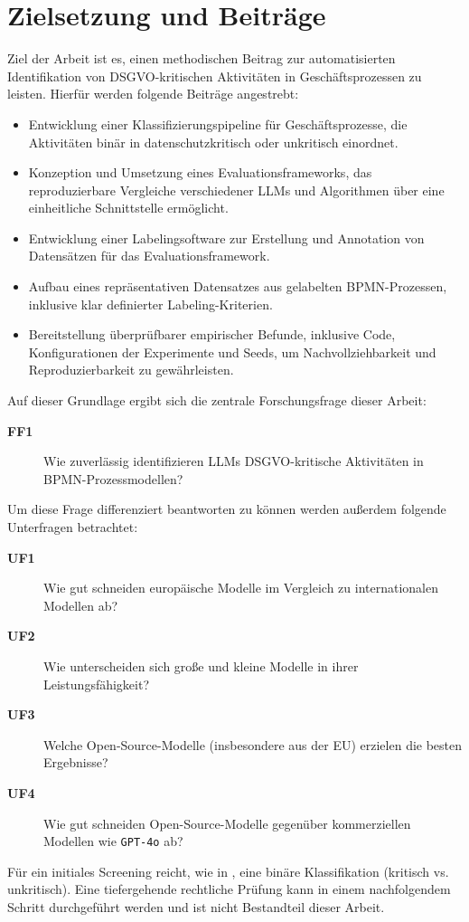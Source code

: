 \section{Zielsetzung und Beiträge}\label{sec:zielsetzung-und-beitrage}

Ziel der Arbeit ist es, einen methodischen Beitrag zur automatisierten Identifikation von \ac{DSGVO}-kritischen Aktivitäten in Geschäftsprozessen zu leisten. Hierfür werden folgende Beiträge angestrebt:

\begin{itemize}
    \item Entwicklung einer Klassifizierungspipeline für Geschäftsprozesse, die Aktivitäten binär in datenschutzkritisch oder unkritisch einordnet.
    \item Konzeption und Umsetzung eines Evaluationsframeworks, das reproduzierbare Vergleiche verschiedener \acp{LLM} und Algorithmen über eine einheitliche Schnittstelle ermöglicht.
    \item Entwicklung einer Labelingsoftware zur Erstellung und Annotation von Datensätzen für das Evaluationsframework.
    \item Aufbau eines repräsentativen Datensatzes aus gelabelten \ac{BPMN}-Prozessen, inklusive klar definierter Labeling-Kriterien.
    \item Bereitstellung überprüfbarer empirischer Befunde, inklusive Code, Konfigurationen der Experimente und Seeds, um Nachvollziehbarkeit und Reproduzierbarkeit zu gewährleisten.
\end{itemize}

Auf dieser Grundlage ergibt sich die zentrale Forschungsfrage dieser Arbeit:

\begin{description}
    \item[\textbf{FF1}] Wie zuverlässig identifizieren \acp{LLM} \ac{DSGVO}-kritische Aktivitäten in \ac{BPMN}-Prozessmodellen?
\end{description}

Um diese Frage differenziert beantworten zu können werden außerdem folgende Unterfragen betrachtet:

\begin{description}
    \item[\textbf{UF1}] Wie gut schneiden europäische Modelle im Vergleich zu internationalen Modellen ab?
    \item[\textbf{UF2}] Wie unterscheiden sich große und kleine Modelle in ihrer Leistungsfähigkeit?
    \item[\textbf{UF3}] Welche Open-Source-Modelle (insbesondere aus der \ac{EU}) erzielen die besten Ergebnisse?
    \item[\textbf{UF4}] Wie gut schneiden Open-Source-Modelle gegenüber kommerziellen Modellen wie \texttt{GPT-4o} ab?
\end{description}

Für ein initiales Screening reicht, wie in \cite{nake2023towards}, eine binäre Klassifikation (kritisch vs. unkritisch). Eine tiefergehende rechtliche Prüfung kann in einem nachfolgendem Schritt durchgeführt werden und ist nicht Bestandteil dieser Arbeit.